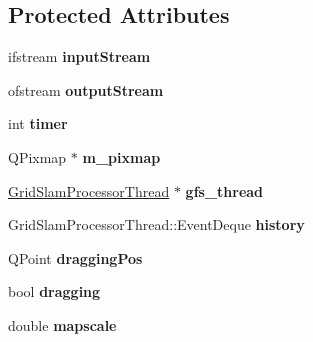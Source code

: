 \subsection*{Protected Attributes}
\begin{DoxyCompactItemize}
\item 
\mbox{\label{classGMapping_1_1QParticleViewer_a64450d61bc47184dcbf3a98e99088326}} 
ifstream {\bfseries input\+Stream}
\item 
\mbox{\label{classGMapping_1_1QParticleViewer_a1b09d93e9ecb0a2a3db9a9e0001ce3a9}} 
ofstream {\bfseries output\+Stream}
\item 
\mbox{\label{classGMapping_1_1QParticleViewer_a59fd80ffb9c3769a83cc7cb8fed889a4}} 
int {\bfseries timer}
\item 
\mbox{\label{classGMapping_1_1QParticleViewer_ad6d1d61c5010cb01637a69e582d6501a}} 
Q\+Pixmap $\ast$ {\bfseries m\+\_\+pixmap}
\item 
\mbox{\label{classGMapping_1_1QParticleViewer_a4fe10989c2361ba236c12c7d2b5ae55e}} 
\hyperlink{structGridSlamProcessorThread}{Grid\+Slam\+Processor\+Thread} $\ast$ {\bfseries gfs\+\_\+thread}
\item 
\mbox{\label{classGMapping_1_1QParticleViewer_ad29a0e8524a4866afba42a47bf0f371f}} 
Grid\+Slam\+Processor\+Thread\+::\+Event\+Deque {\bfseries history}
\item 
\mbox{\label{classGMapping_1_1QParticleViewer_ad634eaa19d5289d49ede2c40a515c735}} 
Q\+Point {\bfseries dragging\+Pos}
\item 
\mbox{\label{classGMapping_1_1QParticleViewer_a5ef5774270871a262015ce3a212b5604}} 
bool {\bfseries dragging}
\item 
\mbox{\label{classGMapping_1_1QParticleViewer_a09983770f6c7907bfb12816da84033f8}} 
double {\bfseries mapscale}
\item 

\end{DoxyCompactItemize}
